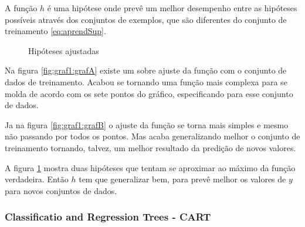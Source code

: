 A função ${h}$ é uma hipótese onde prevê um melhor desempenho entre as hipóteses possíveis através dos conjuntos de exemplos, que são diferentes do conjunto de treinamento \ref{eq:aprendSup}.

 \begin{figure}[h!]
    \centering
    \quad
    
    \caption{Hipóteses ajustadas} \label{fig:graf1}
        
      \end{figure}

Na figura \ref{fig:graf1:grafA} existe um sobre ajuste da função com o conjunto de dados de treinamento. Acabou se tornando uma função mais complexa para se molda de acordo com os sete pontos do gráfico, especificando para esse conjunto de dados. 

Ja na figura \ref{fig:graf1:grafB} o ajuste da função se torna mais simples e mesmo não passando por todos os pontos. Mas acaba generalizando melhor o conjunto de treinamento tornando, talvez, um melhor resultado da predição de novos valores.

A figura \ref{fig:graf1} mostra duas hipóteses que tentam se aproximar ao máximo da função verdadeira. Então ${h}$ tem que generalizar bem, para prevê melhor os valores de ${y}$ para novos conjuntos de dados.

\subsubsection{Classificatio and Regression Trees - CART}\label{sssec:cart}


